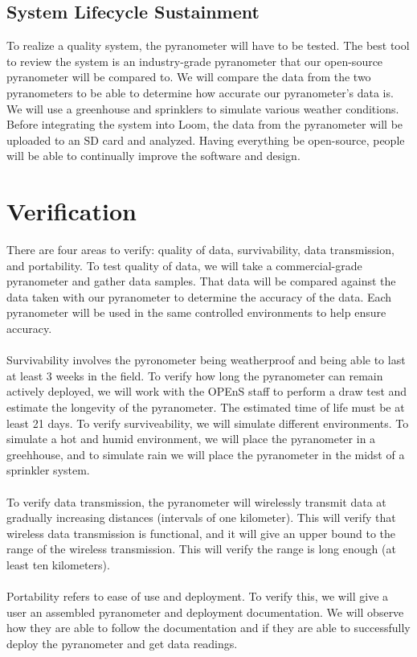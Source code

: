 \documentclass[10pt,draftclsnofoot,onecolumn,letterpaper]{article}
\begin{document}
\subsection{System Lifecycle Sustainment}
To realize a quality system, the pyranometer will have to be tested. The best tool to review the system is an industry-grade pyranometer that our open-source pyranometer will be compared to. We will compare the data from the two pyranometers to be able to determine how accurate our pyranometer's data is. We will use a greenhouse and sprinklers to simulate various weather conditions. Before integrating the system into Loom, the data from the pyranometer will be uploaded to an SD card and analyzed. Having everything be open-source, people will be able to continually improve the software and design.

\section{Verification}
There are four areas to verify: quality of data, survivability, data transmission, and portability. To test quality of data, we will take a commercial-grade pyranometer and gather data samples. That data will be compared against the data taken with our pyranometer to determine the accuracy of the data. Each pyranometer will be used in the same controlled environments to help ensure accuracy.\\\\ Survivability involves the pyronometer being weatherproof and being able to last at least 3 weeks in the field. To verify how long the pyranometer can remain actively deployed, we will work with the OPEnS staff to perform a draw test and estimate the longevity of the pyranometer. The estimated time of life must be at least 21 days. To verify surviveability, we will simulate different environments. To simulate a hot and humid environment, we will place the pyranometer in a greehhouse, and to simulate rain we will place the pyranometer in the midst of a sprinkler system.\\\\To verify data transmission, the pyranometer will wirelessly transmit data at gradually increasing distances (intervals of one kilometer). This will verify that wireless data transmission is functional, and it will give an upper bound to the range of the wireless transmission. This will verify the range is long enough (at least ten kilometers).\\\\Portability refers to ease of use and deployment. To verify this, we will give a user an assembled pyranometer and deployment documentation. We will observe how they are able to follow the documentation and if they are able to successfully deploy the pyranometer and get data readings.
\end{document}

